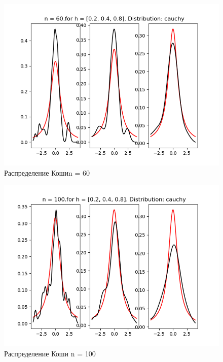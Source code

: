 \documentclass[a4]{article}
\begin{document}
\begin{center}
\begin{figure}[h!]
				\includegraphics[width=\textwidth]{cauchyker60.png}
				\caption[Распределение Коши n = 60]{Распределение Кошиn = 60}
			\end{figure}
			\newpage
			\begin{figure}[h!]
				\includegraphics[width=\textwidth]{cauchyker100.png}
				\caption[Распределение Коши n = 100]{Распределение Коши n = 100}
			\end{figure}
			\newpage
			\begin{figure}[h!]

\end{figure}
\end{center}
\end{document}
